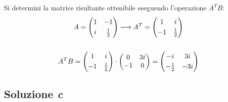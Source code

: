 \documentclass[a4paper]{article}
\makeatletter
\newenvironment{rowequmat}[1]{\left(\array{@{}#1@{}}}{\endarray\right)}
\makeatother
\begin{document}
	Si determini la matrice risultante ottenibile eseguendo l'operazione $A^{T} B$:
	\begin{gather*}
		A = \begin{rowequmat}{cc}
			1 & -1 \\ [0.3em]
			i & \frac{1}{2}
		\end{rowequmat} \longrightarrow
		A^{T} = \begin{rowequmat}{cc}
			1 & i \\ [0.3em]
			-1 & \frac{1}{2}
		\end{rowequmat}\\
		\\
		A^{T} B = \begin{rowequmat}{cc}
			1 & i \\ [0.3em]
			-1 & \frac{1}{2}
		\end{rowequmat} \cdot \begin{rowequmat}{cc}
			0 & 3i \\
			-1 & 0
		\end{rowequmat} =
		\begin{rowequmat}{cc}
			-i & 3i \\[0.3em]
			-\frac{1}{2} & -3i
		\end{rowequmat}
	\end{gather*}
	
	\subsection{Soluzione \emph{c}}
	
\end{document}
